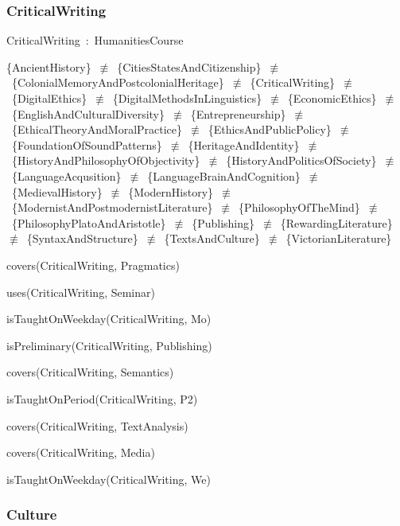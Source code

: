 \documentclass{article}
\begin{document}
\subsubsection*{CriticalWriting}

CriticalWriting~:~HumanitiesCourse

\{AncientHistory\}~\ensuremath{\not\equiv}~\{CitiesStatesAndCitizenship\}~\ensuremath{\not\equiv}~\{ColonialMemoryAndPostcolonialHeritage\}~\ensuremath{\not\equiv}~\{CriticalWriting\}~\ensuremath{\not\equiv}~\{DigitalEthics\}~\ensuremath{\not\equiv}~\{DigitalMethodsInLinguistics\}~\ensuremath{\not\equiv}~\{EconomicEthics\}~\ensuremath{\not\equiv}~\{EnglishAndCulturalDiversity\}~\ensuremath{\not\equiv}~\{Entrepreneurship\}~\ensuremath{\not\equiv}~\{EthicalTheoryAndMoralPractice\}~\ensuremath{\not\equiv}~\{EthicsAndPublicPolicy\}~\ensuremath{\not\equiv}~\{FoundationOfSoundPatterns\}~\ensuremath{\not\equiv}~\{HeritageAndIdentity\}~\ensuremath{\not\equiv}~\{HistoryAndPhilosophyOfObjectivity\}~\ensuremath{\not\equiv}~\{HistoryAndPoliticsOfSociety\}~\ensuremath{\not\equiv}~\{LanguageAcqusition\}~\ensuremath{\not\equiv}~\{LanguageBrainAndCognition\}~\ensuremath{\not\equiv}~\{MedievalHistory\}~\ensuremath{\not\equiv}~\{ModernHistory\}~\ensuremath{\not\equiv}~\{ModernistAndPostmodernistLiterature\}~\ensuremath{\not\equiv}~\{PhilosophyOfTheMind\}~\ensuremath{\not\equiv}~\{PhilosophyPlatoAndAristotle\}~\ensuremath{\not\equiv}~\{Publishing\}~\ensuremath{\not\equiv}~\{RewardingLiterature\}~\ensuremath{\not\equiv}~\{SyntaxAndStructure\}~\ensuremath{\not\equiv}~\{TextsAndCulture\}~\ensuremath{\not\equiv}~\{VictorianLiterature\}

covers(CriticalWriting, Pragmatics)

uses(CriticalWriting, Seminar)

isTaughtOnWeekday(CriticalWriting, Mo)

isPreliminary(CriticalWriting, Publishing)

covers(CriticalWriting, Semantics)

isTaughtOnPeriod(CriticalWriting, P2)

covers(CriticalWriting, TextAnalysis)

covers(CriticalWriting, Media)

isTaughtOnWeekday(CriticalWriting, We)

\subsubsection*{Culture}
\end{document}
